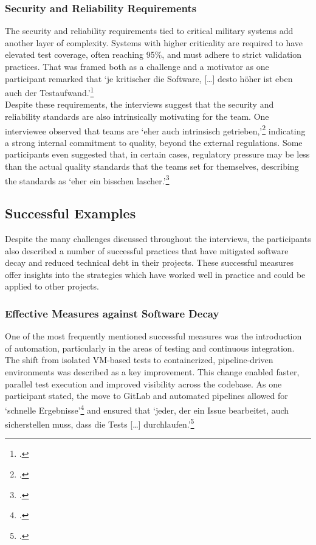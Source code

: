 \subsubsection{Security and Reliability Requirements}
The security and reliability requirements tied to critical military systems add another layer of complexity. Systems with higher criticality are required to have elevated test coverage, often reaching 95\%, and must adhere to strict validation practices. That was framed both as a challenge and a motivator
as one participant remarked that `je kritischer die Software, [\ldots] desto höher ist eben auch der Testaufwand.'\footcite{Interview22025}\\
Despite these requirements, the interviews suggest that the security and reliability standards are also intrinsically motivating for the team. One interviewee observed that teams are `eher auch intrinsisch getrieben,'\footcite{Interview32025} indicating a strong internal commitment to quality, beyond the external regulations. 
Some participants even suggested that, in certain cases, regulatory pressure may be less than the actual quality standards that the teams set for themselves, describing the standards as `eher ein bisschen lascher.'\footcite{Interview32025}

\subsection{Successful Examples}
Despite the many challenges discussed throughout the interviews, the participants also described a number of successful practices that have mitigated software decay and reduced technical debt in their projects. These successful measures offer insights into the strategies which have worked well in practice and could be applied to other projects.

\subsubsection{Effective Measures against Software Decay}
One of the most frequently mentioned successful measures was the introduction of automation, particularly in the areas of testing and continuous integration. The shift from isolated VM-based tests to containerized, pipeline-driven environments was described as a key improvement. This change enabled faster, parallel test execution
and improved visibility across the codebase. As one participant stated, the move to GitLab and automated pipelines allowed for `schnelle Ergebnisse'\footcite{Interview32025} and ensured that `jeder, der ein Issue bearbeitet, auch sicherstellen muss, dass die Tests [\ldots] durchlaufen.'\footcite{Interview32025}\\

